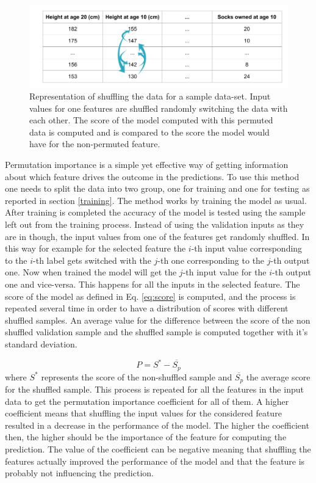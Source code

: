 \begin{figure}[!tp]
	\centering		  
	\includegraphics[width=1.\textwidth]{figures/permutation.png}
	\caption{Representation of shuffling the data for a sample data-set. Input values for one features are shuffled randomly switching the data with each other. The score of the model computed with this permuted data is computed and is compared  to the score the model would have for the non-permuted feature.}
	\label{fig:permutation}
\end{figure}

Permutation importance is a simple yet effective way of getting information about which feature drives the outcome in the predictions. To use this method one needs to split the data into two group, one for training and one for testing as reported in section \ref{training}. The method works by training the model as usual. After training is completed the accuracy of the model is tested using the sample left out from the training process. Instead of using the validation inputs as they are in though, the input values from one of the features get randomly shuffled. In this way for example for the selected feature the $i$-th input value corresponding to the $i$-th label gets switched with the $j$-th one corresponding to the $j$-th output one. Now when trained the model will get the $j$-th input value for the $i$-th output one and vice-versa. This happens for all the inputs in the selected feature. The score of the model as defined in Eq. \ref{eq:score} is computed, and the process is repeated several time in order to have a distribution of scores with different shuffled samples. An average value for the difference between the score of the non shuffled validation sample and the shuffled sample is computed together with it's standard deviation.

\begin{equation}\label{eq:perm}
P = S^*-\overline{S_p}
\end{equation} 
where $S^*$ represents the score of the non-shuffled sample and $\overline{S_p}$ the average score for the shuffled sample.
This process is repeated for all the features in the input data to get the permutation importance coefficient for all of them.
A higher coefficient means that shuffling the input values for the considered feature resulted in a decrease in the performance of the model. The higher the coefficient then, the higher should be the importance of the feature for computing the prediction. The value of the coefficient can be negative meaning that shuffling the features actually improved the performance of the model and that the feature is probably not influencing the prediction.

